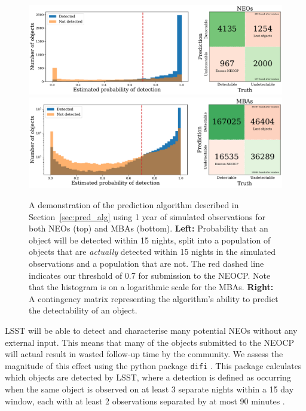 \documentclass[twocolumn]{aastex631}
\newcommand{\needcite}{{\color{magenta}{(needs citation)}}}
\begin{document}
\begin{figure}[htb]
    \centering
    \includegraphics[width=\textwidth]{contingency_neo.pdf}
    \includegraphics[width=\textwidth]{contingency_mba.pdf}
    \caption{A demonstration of the prediction algorithm described in Section~\ref{sec:pred_alg} using 1 year of simulated observations for both NEOs (top) and MBAs (bottom). \textbf{Left:} Probability that an object will be detected within 15 nights, split into a population of objects that are \textit{actually} detected within 15 nights in the simulated observations and a population that are not. The red dashed line indicates our threshold of 0.7 for submission to the NEOCP. Note that the histogram is on a logarithmic scale for the MBAs. \textbf{Right:} A contingency matrix representing the algorithm's ability to predict the detectability of an object.}
    \label{fig:contingency}
\end{figure}

LSST will be able to detect and characterise many potential NEOs without any external input. This means that many of the objects submitted to the NEOCP will actual result in wasted follow-up time by the community. We assess the magnitude of this effect using the python package \texttt{difi} \citep{difi}. This package calculates which objects are detected by LSST, where a detection is defined as occurring when the same object is observed on at least 3 separate nights within a 15 day window, each with at least 2 observations separated by at most 90 minutes \needcite{}.
\end{document}
